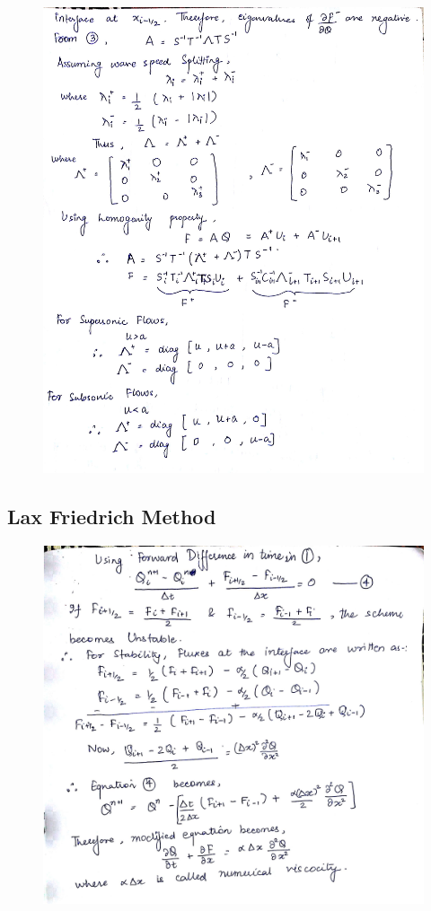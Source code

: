 \documentclass{article}
\begin{document}
\begin{figure}[H]   \label{figure}
\includegraphics[width=15cm]{five.jpg}
\label{figure:}
\end{figure}
\newpage

\subsection*{Lax Friedrich Method}

\begin{figure}[H]   \label{figure}
\includegraphics[width=15cm]{six.jpg}
\label{figure:}
\end{figure}
\newpage
\end{document}
